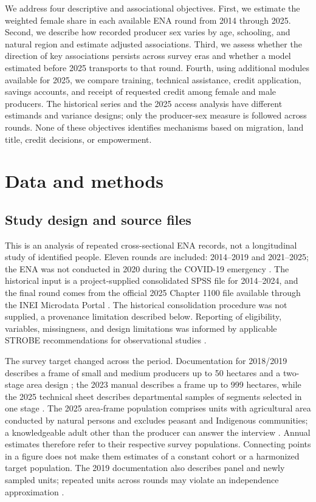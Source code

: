 \documentclass[11pt,a4paper]{article}
\begin{document}
We address four descriptive and associational objectives. First, we estimate the weighted female share in each available ENA round from 2014 through 2025. Second, we describe how recorded producer sex varies by age, schooling, and natural region and estimate adjusted associations. Third, we assess whether the direction of key associations persists across survey eras and whether a model estimated before 2025 transports to that round. Fourth, using additional modules available for 2025, we compare training, technical assistance, credit application, savings accounts, and receipt of requested credit among female and male producers. The historical series and the 2025 access analysis have different estimands and variance designs; only the producer-sex measure is followed across rounds. None of these objectives identifies mechanisms based on migration, land title, credit decisions, or empowerment.

\section{Data and methods}
\subsection{Study design and source files}
This is an analysis of repeated cross-sectional ENA records, not a longitudinal study of identified people. Eleven rounds are included: 2014--2019 and 2021--2025; the ENA was not conducted in 2020 during the COVID-19 emergency \cite{ineiods2025}. The historical input is a project-supplied consolidated SPSS file for 2014--2024, and the final round comes from the official 2025 Chapter 1100 file available through the INEI Microdata Portal \cite{ineiportal}. The historical consolidation procedure was not supplied, a provenance limitation described below. Reporting of eligibility, variables, missingness, and design limitations was informed by applicable STROBE recommendations for observational studies \cite{strobe2007}.

The survey target changed across the period. Documentation for 2018/2019 describes a frame of small and medium producers up to 50 hectares and a two-stage area design \cite{inei2018,inei2019}; the 2023 manual describes a frame up to 999 hectares, while the 2025 technical sheet describes departmental samples of segments selected in one stage \cite{inei2023,inei2025}. The 2025 area-frame population comprises units with agricultural area conducted by natural persons and excludes peasant and Indigenous communities; a knowledgeable adult other than the producer can answer the interview \cite{inei2025}. Annual estimates therefore refer to their respective survey populations. Connecting points in a figure does not make them estimates of a constant cohort or a harmonized target population. The 2019 documentation also describes panel and newly sampled units; repeated units across rounds may violate an independence approximation \cite{inei2019}.
\end{document}
